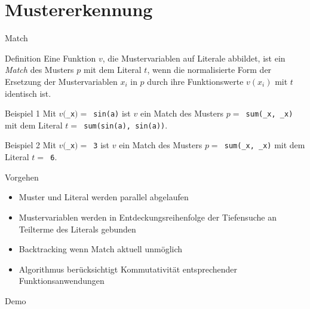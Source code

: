 \documentclass{beamer}
\begin{document}
\section{Mustererkennung}
\begin{frame}[fragile]{Match}
	\begin{block}{Definition}
		Eine Funktion $v$, die Mustervariablen auf Literale abbildet, ist ein \emph{Match} des Musters $p$ mit dem Literal $t$, wenn die normalisierte Form der Ersetzung der Mustervariablen $x_i$ in $p$ durch ihre Funktionswerte $v(x_i)$ mit $t$ identisch ist.
	\end{block}
	
	\pause
	\begin{block}{Beispiel 1}
		Mit $v($\verb~_x~$) =$\verb~ sin(a)~ ist $v$ ein Match des
		Musters $p =$\verb~ sum(_x, _x)~ mit dem Literal $t =$\verb~ sum(sin(a), sin(a))~.
	\end{block}
	
	\pause
	\begin{block}{Beispiel 2}
		Mit $v($\verb~_x~$) =$\verb~ 3~ ist $v$ ein Match des
		Musters $p =$\verb~ sum(_x, _x)~ mit dem Literal $t =$\verb~ 6~.
	\end{block}
\end{frame}


\begin{frame}[fragile]{Vorgehen}
	\begin{itemize}
		\item{Muster und Literal werden parallel abgelaufen}
		\item{Mustervariablen werden in Entdeckungsreihenfolge der Tiefensuche an Teilterme des Literals gebunden}
		\item{Backtracking wenn Match aktuell unmöglich}
		\item{Algorithmus berücksichtigt Kommutativität entsprechender Funktionsanwendungen}
	\end{itemize}
\end{frame}





\begin{frame}{Demo}
\end{frame}
\end{document}
